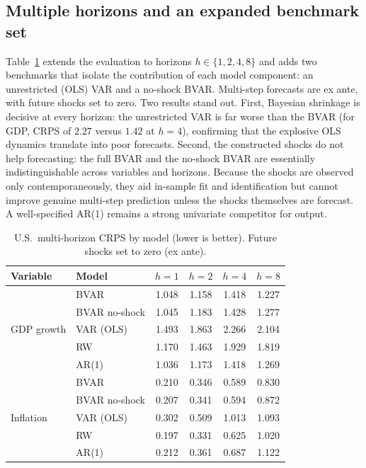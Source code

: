 \documentclass[conference]{IEEEtran}
\begin{document}
\subsection{Multiple horizons and an expanded benchmark set}
Table~\ref{tab:horizon} extends the evaluation to horizons $h\in\{1,2,4,8\}$ and
adds two benchmarks that isolate the contribution of each model component: an
unrestricted (OLS) VAR and a no-shock BVAR. Multi-step forecasts are ex ante,
with future shocks set to zero. Two results stand out. First, Bayesian shrinkage
is decisive at every horizon: the unrestricted VAR is far worse than the BVAR
(for GDP, CRPS of $2.27$ versus $1.42$ at $h=4$), confirming that the explosive
OLS dynamics translate into poor forecasts. Second, the constructed shocks do not
help forecasting: the full BVAR and the no-shock BVAR are essentially
indistinguishable across variables and horizons. Because the shocks are observed
only contemporaneously, they aid in-sample fit and identification but cannot
improve genuine multi-step prediction unless the shocks themselves are forecast.
A well-specified AR(1) remains a strong univariate competitor for output.

\begin{table}[t]
\caption{U.S.\ multi-horizon CRPS by model (lower is better). Future shocks set to
zero (ex ante).}
\label{tab:horizon}
\centering
\footnotesize
\setlength{\tabcolsep}{4pt}
\begin{tabular}{@{}llcccc@{}}
\toprule
Variable & Model & $h{=}1$ & $h{=}2$ & $h{=}4$ & $h{=}8$ \\
\midrule
\multirow{5}{*}{GDP growth}
 & BVAR          & 1.048 & 1.158 & 1.418 & 1.227 \\
 & BVAR no-shock & 1.045 & 1.183 & 1.428 & 1.277 \\
 & VAR (OLS)     & 1.493 & 1.863 & 2.266 & 2.104 \\
 & RW            & 1.170 & 1.463 & 1.929 & 1.819 \\
 & AR(1)         & 1.036 & 1.173 & 1.418 & 1.269 \\
\midrule
\multirow{5}{*}{Inflation}
 & BVAR          & 0.210 & 0.346 & 0.589 & 0.830 \\
 & BVAR no-shock & 0.207 & 0.341 & 0.594 & 0.872 \\
 & VAR (OLS)     & 0.302 & 0.509 & 1.013 & 1.093 \\
 & RW            & 0.197 & 0.331 & 0.625 & 1.020 \\
 & AR(1)         & 0.212 & 0.361 & 0.687 & 1.122 \\
\bottomrule
\end{tabular}
\end{table}
\end{document}
